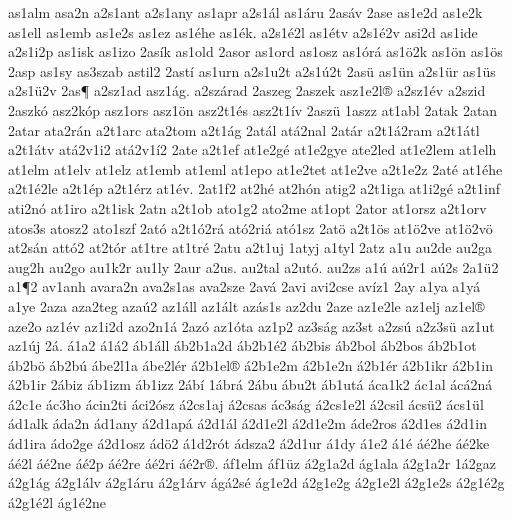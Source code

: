 {as1alm
asa2n
a2s1ant
a2s1any
as1apr
a2s1^^e1l
as1^^e1ru
2as^^e1v
2ase
as1e2d
as1e2k
as1ell
as1emb
as1e2s
as1ez
as1^^e9he
as1^^e9k.
a2s1^^e92l
as1^^e9tv
a2s1^^e92v
asi2d
as1ide
a2s1i2p
as1isk
as1izo
2as^^edk
as1old
2asor
as1ord
as1osz
as1^^f3r^^e1
as1^^f62k
as1^^f6n
as1^^f6s
2asp
as1sy
as3szab
astil2
2ast^^ed
as1urn
a2s1u2t
a2s1^^fa2t
2as^^fc
as1^^fcn
a2s1^^fcr
as1^^fcs
a2s1^^fc2v
2as^^b6
a2sz1ad
asz1^^e1g.
a2sz^^e1rad
2aszeg
2aszek
asz1e2l^^ae
a2sz1^^e9v
a2szid
2aszk^^f3
asz2k^^f3p
asz1ors
asz1^^f6n
asz2t1^^e9s
asz2t1^^edv
2asz^^fc
1aszz
at1abl
2atak
2atan
2atar
ata2r^^e1n
a2t1arc
ata2tom
a2t1^^e1g
2at^^e1l
at^^e12nal
2at^^e1r
a2t1^^e12ram
a2t1^^e1tl
a2t1^^e1tv
at^^e12v1i2
at^^e12v1^^ed2
2ate
a2t1ef
at1e2g^^e9
at1e2gye
ate2led
at1e2lem
at1elh
at1elm
at1elv
at1elz
at1emb
at1eml
at1epo
at1e2tet
at1e2ve
a2t1e2z
2at^^e9
at1^^e9he
a2t1^^e92le
a2t1^^e9p
a2t1^^e9rz
at1^^e9v.
2at1f2
at2h^^e9
at2h^^f3n
atig2
a2t1iga
at1i2g^^e9
a2t1inf
ati2n^^f3
at1iro
a2t1isk
2atn
a2t1ob
ato1g2
ato2me
at1opt
2ator
at1orsz
a2t1orv
atos3s
atosz2
ato1szf
2at^^f3
a2t1^^f32r^^e1
at^^f32ri^^e1
at^^f31sz
2at^^f6
a2t1^^f6s
at1^^f62ve
at1^^f62v^^f6
at2s^^e1n
att^^f32
at2t^^f3r
at1tre
at1tr^^e9
2atu
a2t1uj
1atyj
a1tyl
2atz
a1u
au2de
au2ga
aug2h
au2go
au1k2r
au1ly
2aur
a2us.
au2tal
a2ut^^f3.
au2zs
a1^^fa
a^^fa2r1
a^^fa2s
2a1^^fc2
a1^^b62
av1anh
avara2n
ava2s1as
ava2sze
2av^^e1
2avi
avi2cse
av^^edz1
2ay
a1ya
a1y^^e1
a1ye
2aza
aza2teg
aza^^fa2
az1^^e1ll
az1^^e1lt
az^^e1s1s
az2du
2aze
az1e2le
az1elj
az1el^^ae
aze2o
az1^^e9v
az1i2d
azo2n1^^e1
2az^^f3
az1^^f3ta
az1p2
az3s^^e1g
az3st
a2zs^^fa
a2z3s^^fc
az1ut
az1^^faj
2^^e1.
^^e11a2
^^e11^^e12
^^e1b1^^e1ll
^^e1b2b1a2d
^^e1b2b1^^e92
^^e1b2bis
^^e1b2bol
^^e1b2bos
^^e1b2b1ot
^^e1b2b^^f6
^^e1b2b^^fa
^^e1be2l1a
^^e1be2l^^e9r
^^e12b1el^^ae
^^e12b1e2m
^^e12b1e2n
^^e12b1^^e9r
^^e12b1ikr
^^e12b1in
^^e12b1ir
2^^e1biz
^^e1b1izm
^^e1b1izz
2^^e1b^^ed
1^^e1br^^e1
2^^e1bu
^^e1bu2t
^^e1b1ut^^e1
^^e1ca1k2
^^e1c1al
^^e1c^^e12n^^e1
^^e12c1e
^^e1c3ho
^^e1cin2ti
^^e1ci2^^f3sz
^^e12cs1aj
^^e12csas
^^e1c3s^^e1g
^^e12cs1e2l
^^e12csil
^^e1cs^^fc2
^^e1cs1^^fcl
^^e1d1alk
^^e1da2n
^^e1d1any
^^e12d1ap^^e1
^^e12d1^^e1l
^^e12d1e2l
^^e12d1e2m
^^e1de2ros
^^e12d1es
^^e12d1in
^^e1d1ira
^^e1do2ge
^^e12d1osz
^^e1d^^f62
^^e11d2r^^f3t
^^e1dsza2
^^e12d1ur
^^e11dy
^^e11e2
^^e11^^e9
^^e1^^e92he
^^e1^^e92ke
^^e1^^e92l
^^e1^^e92ne
^^e1^^e92p
^^e1^^e92re
^^e1^^e92ri
^^e1^^e92r^^ae.
^^e1f1elm
^^e1f1^^fcz
^^e12g1a2d
^^e1g1ala
^^e12g1a2r
1^^e12gaz
^^e12g1^^e1g
^^e12g1^^e1lv
^^e12g1^^e1ru
^^e12g1^^e1rv
^^e1g^^e12s^^e9
^^e1g1e2d
^^e12g1e2g
^^e12g1e2l
^^e12g1e2s
^^e12g1^^e92g
^^e12g1^^e92l
^^e1g1^^e92ne
}
